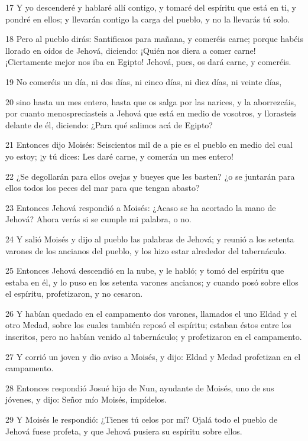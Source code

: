 \par 17 Y yo descenderé y hablaré allí contigo, y tomaré del espíritu que está en ti, y pondré en ellos; y llevarán contigo la carga del pueblo, y no la llevarás tú solo.
\par 18 Pero al pueblo dirás: Santificaos para mañana, y comeréis carne; porque habéis llorado en oídos de Jehová, diciendo: ¡Quién nos diera a comer carne! ¡Ciertamente mejor nos iba en Egipto! Jehová, pues, os dará carne, y comeréis.
\par 19 No comeréis un día, ni dos días, ni cinco días, ni diez días, ni veinte días,
\par 20 sino hasta un mes entero, hasta que os salga por las narices, y la aborrezcáis, por cuanto menospreciasteis a Jehová que está en medio de vosotros, y llorasteis delante de él, diciendo: ¿Para qué salimos acá de Egipto?
\par 21 Entonces dijo Moisés: Seiscientos mil de a pie es el pueblo en medio del cual yo estoy; ¡y tú dices: Les daré carne, y comerán un mes entero!
\par 22 ¿Se degollarán para ellos ovejas y bueyes que les basten? ¿o se juntarán para ellos todos los peces del mar para que tengan abasto?
\par 23 Entonces Jehová respondió a Moisés: ¿Acaso se ha acortado la mano de Jehová? Ahora verás si se cumple mi palabra, o no.
\par 24 Y salió Moisés y dijo al pueblo las palabras de Jehová; y reunió a los setenta varones de los ancianos del pueblo, y los hizo estar alrededor del tabernáculo.
\par 25 Entonces Jehová descendió en la nube, y le habló; y tomó del espíritu que estaba en él, y lo puso en los setenta varones ancianos; y cuando posó sobre ellos el espíritu, profetizaron, y no cesaron.
\par 26 Y habían quedado en el campamento dos varones, llamados el uno Eldad y el otro Medad, sobre los cuales también reposó el espíritu; estaban éstos entre los inscritos, pero no habían venido al tabernáculo; y profetizaron en el campamento.
\par 27 Y corrió un joven y dio aviso a Moisés, y dijo: Eldad y Medad profetizan en el campamento.
\par 28 Entonces respondió Josué hijo de Nun, ayudante de Moisés, uno de sus jóvenes, y dijo: Señor mío Moisés, impídelos.
\par 29 Y Moisés le respondió: ¿Tienes tú celos por mí? Ojalá todo el pueblo de Jehová fuese profeta, y que Jehová pusiera su espíritu sobre ellos.
